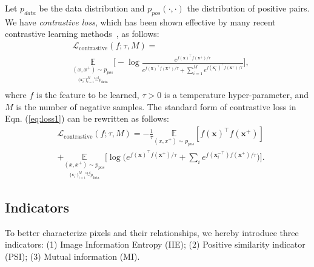 \documentclass[10pt,twocolumn,letterpaper]{article}
\begin{document}
Let $p_{data}$ be the data distribution and $p_{pos}(\cdot, \cdot)$ the distribution of positive pairs. We have \textit{contrastive loss}, which has been shown effective by many recent contrastive learning methods~\cite{oord2018representation,yao2021one}, as follows:
\begin{equation}
\begin{aligned}
    &\mathcal{L}_\text{contrastive}(f;\tau,M) = \\
    &\underset{ \underset{\{\mathbf{x}^-_i\}^M_{i=1} \overset{\text{i.i.d}}{\sim} p_\texttt{data}}{(x,x^+) \sim p_{pos}}}{\mathbb{E}} \Big[-\log\frac{e^{f(\mathbf{x})^\top f(\mathbf{x^+}) / \tau}}{e^{f(\mathbf{x})^\top f(\mathbf{x^+}) / \tau} + \sum_{i=1}^M e^{f(\mathbf{x}_i^-)^\top f(\mathbf{x^+}) / \tau}} \Big] , \\
\end{aligned}
\label{eq:loss1}
\end{equation}
where $f$ is the feature to be learned, $\tau>0$ is a temperature hyper-parameter, and $M$ is the number of negative samples.  
The standard form of contrastive loss in Eqn. (\ref{eq:loss1}) can be rewritten as follows:
\begin{equation}
\begin{aligned}
    &\mathcal{L}_\text{contrastive}(f;\tau,M) = - \frac{1}{\tau} \underset{(x,x^+) \sim p_{pos}}{\mathbb{E}} [f(\mathbf{x})^\top f(\mathbf{x^+})] \\
    &+\underset{ \underset{\{\mathbf{x}^-_i\}^M_{i=1} \overset{\text{i.i.d}}{\sim} p_\texttt{data}}{(x,x^+) \sim p_{pos}}}{\mathbb{E}} \Big[ \log \Big( e^{f(\mathbf{x})^\top f(\mathbf{x^+}) / \tau} + \sum_{i} e^{f(\mathbf{x}_i^-^\top )f(\mathbf{x^+}) / \tau}\Big) \Big]. 
\end{aligned}
\label{eq:eq2}
\end{equation}

\subsection{Indicators} \label{sec:indicators}
To better characterize pixels and their relationships, we hereby introduce three indicators: (1) Image Information Entropy (IIE); (2) {Positive similarity indicator} (PSI); (3) {Mutual information} (MI).
\end{document}
